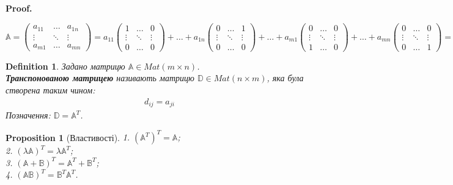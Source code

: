 \documentclass[a4paper, 10pt]{article}
\makeatletter
\theoremstyle{theoremdd}
\newtheorem{definition}[theorem]{Definition}
\newtheorem{proposition}[theorem]{Proposition}
\renewenvironment{proof}[1][Proof.\\]{\par
\pushQED{\hfill \qed}%
\normalfont \topsep6\p@\@plus6\p@\relax
\trivlist
\item\relax
{\bfseries
#1\@addpunct{.}}\hspace\labelsep\ignorespaces
}{%
\popQED\endtrivlist\@endpefalse
}
\makeatother
\begin{document}
	\begin{proof}
	$\mathbb{A} = \begin{pmatrix}
	a_{11} & \dots & a_{1n} \\
	\vdots & \ddots & \vdots \\
	a_{m1} & \dots & a_{mn} 
	\end{pmatrix} = a_{11}\begin{pmatrix}
	1 & \dots & 0 \\
	\vdots & \ddots & \vdots \\
	0 & \dots & 0 
	\end{pmatrix} + \dots + a_{1n}\begin{pmatrix}
	0 & \dots & 1 \\
	\vdots & \ddots & \vdots \\
	0 & \dots & 0 
	\end{pmatrix} + \dots + a_{m1}\begin{pmatrix}
	0 & \dots & 0 \\
	\vdots & \ddots & \vdots \\
	1 & \dots & 0 
	\end{pmatrix} + \dots + a_{mn}\begin{pmatrix}
	0 & \dots & 0 \\
	\vdots & \ddots & \vdots \\
	0 & \dots & 1 
	\end{pmatrix} = a_{11}E_{11} + \dots + a_{1n}E_{1n} + \dots + a_{m1}E_{m1} + \dots + a_{mn}E_{mn}$
	\end{proof}
	
	\begin{definition}
	Задано матрицю $\mathbb{A} \in Mat(m \times n)$.\\
	\textbf{Транспонованою матрицею} називають матрицю $\mathbb{D} \in Mat(n \times m)$, яка була створена таким чином:
	\begin{align*}
	d_{ij} = a_{ji}
	\end{align*}
	Позначення: $\mathbb{D} = \mathbb{A}^T$.
	\end{definition}
	
	\begin{proposition}[Властивості]
	1. $(\mathbb{A}^T)^T = \mathbb{A}$; \\
	2. $(\lambda \mathbb{A})^T = \lambda \mathbb{A}^T$; \\
	3. $(\mathbb{A} + \mathbb{B})^T = \mathbb{A}^T + \mathbb{B}^T$; \\
	4. $(\mathbb{A} \mathbb{B})^T = \mathbb{B}^T \mathbb{A}^T$.
	\end{proposition}
	
\end{document}
